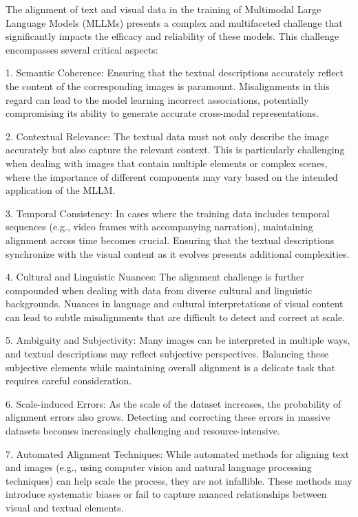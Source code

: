 The alignment of text and visual data in the training of Multimodal Large Language Models (MLLMs) presents a complex and multifaceted challenge that significantly impacts the efficacy and reliability of these models. This challenge encompasses several critical aspects:

1. Semantic Coherence: Ensuring that the textual descriptions accurately reflect the content of the corresponding images is paramount. Misalignments in this regard can lead to the model learning incorrect associations, potentially compromising its ability to generate accurate cross-modal representations.

2. Contextual Relevance: The textual data must not only describe the image accurately but also capture the relevant context. This is particularly challenging when dealing with images that contain multiple elements or complex scenes, where the importance of different components may vary based on the intended application of the MLLM.

3. Temporal Consistency: In cases where the training data includes temporal sequences (e.g., video frames with accompanying narration), maintaining alignment across time becomes crucial. Ensuring that the textual descriptions synchronize with the visual content as it evolves presents additional complexities.

4. Cultural and Linguistic Nuances: The alignment challenge is further compounded when dealing with data from diverse cultural and linguistic backgrounds. Nuances in language and cultural interpretations of visual content can lead to subtle misalignments that are difficult to detect and correct at scale.

5. Ambiguity and Subjectivity: Many images can be interpreted in multiple ways, and textual descriptions may reflect subjective perspectives. Balancing these subjective elements while maintaining overall alignment is a delicate task that requires careful consideration.

6. Scale-induced Errors: As the scale of the dataset increases, the probability of alignment errors also grows. Detecting and correcting these errors in massive datasets becomes increasingly challenging and resource-intensive.

7. Automated Alignment Techniques: While automated methods for aligning text and images (e.g., using computer vision and natural language processing techniques) can help scale the process, they are not infallible. These methods may introduce systematic biases or fail to capture nuanced relationships between visual and textual elements.

